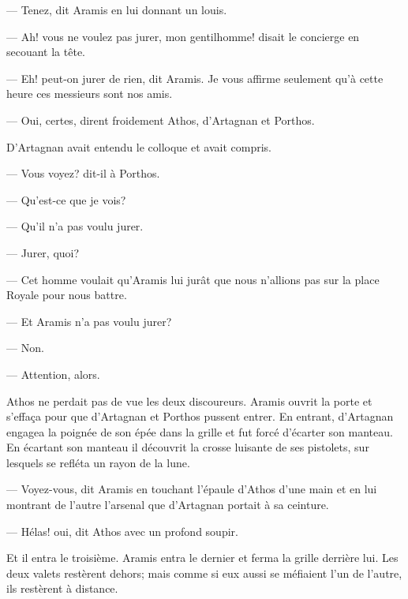 — Tenez, dit Aramis en lui donnant un louis.

— Ah! vous ne voulez pas jurer, mon gentilhomme! disait le concierge en secouant la tête.

— Eh! peut-on jurer de rien, dit Aramis. Je vous affirme seulement qu'à cette heure ces messieurs sont nos amis.

— Oui, certes, dirent froidement Athos, d'Artagnan et Porthos.

D'Artagnan avait entendu le colloque et avait compris.

— Vous voyez? dit-il à Porthos.

— Qu'est-ce que je vois?

— Qu'il n'a pas voulu jurer.

— Jurer, quoi?

— Cet homme voulait qu'Aramis lui jurât que nous n'allions pas sur la place Royale pour nous battre.

— Et Aramis n'a pas voulu jurer?

— Non.

— Attention, alors.

Athos ne perdait pas de vue les deux discoureurs. Aramis ouvrit la porte et s'effaça pour que d'Artagnan et Porthos pussent entrer. En entrant, d'Artagnan engagea la poignée de son épée dans la grille et fut forcé d'écarter son manteau. En écartant son manteau il découvrit la crosse luisante de ses pistolets, sur lesquels se refléta un rayon de la lune.

— Voyez-vous, dit Aramis en touchant l'épaule d'Athos d'une main et en lui montrant de l'autre l'arsenal que d'Artagnan portait à sa ceinture.

— Hélas! oui, dit Athos avec un profond soupir.

Et il entra le troisième. Aramis entra le dernier et ferma la grille derrière lui. Les deux valets restèrent dehors; mais comme si eux aussi se méfiaient l'un de l'autre, ils restèrent à distance.